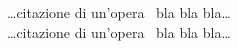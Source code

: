 \documentclass{book}
\begin{document}
\dots{}citazione di un'opera~\cite{eco:tesi} bla bla bla\dots{}
\\
\dots{}citazione di un'opera~\cite{mori:tesi} bla bla bla\dots{}

\cleardoublepage
\nocite {*}
\printbibliography
\end{document}
